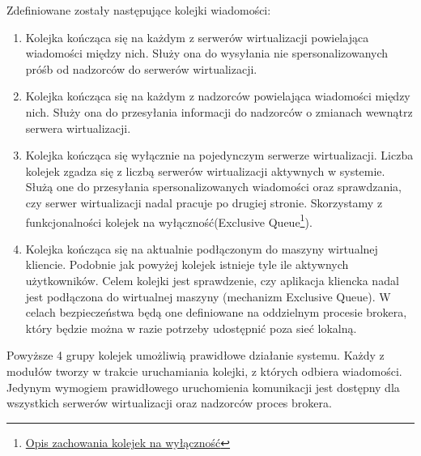 \documentclass[../opis-rozwiazania.tex]{subfiles}
\begin{document}
Zdefiniowane zostały następujące kolejki wiadomości:
\begin{enumerate}[label=(\Roman*)]
    \item \label{modules:broker:queue-virtsrv} Kolejka kończąca się na każdym z serwerów wirtualizacji powielająca wiadomości między nich.
          Służy ona do wysyłania nie spersonalizowanych próśb od nadzorców do serwerów wirtualizacji.
    \item \label{modules:broker:queue-overseers} Kolejka kończąca się na każdym z nadzorców powielająca wiadomości między nich.
          Służy ona do przesyłania informacji do nadzorców o zmianach wewnątrz serwera wirtualizacji.
    \item \label{modules:broker:queue-exclusive} Kolejka kończąca się wyłącznie na pojedynczym serwerze wirtualizacji.
          Liczba kolejek zgadza się z liczbą serwerów wirtualizacji aktywnych w systemie.
          Służą one do przesyłania spersonalizowanych wiadomości oraz sprawdzania, czy serwer wirtualizacji nadal pracuje po drugiej stronie.
          Skorzystamy z funkcjonalności kolejek na wyłączność(Exclusive Queue\footnote{\href{https://www.rabbitmq.com/queues.html\#exclusive-queues}{Opis zachowania kolejek na wyłączność}}).
    \item \label{modules:broker:queue-users} Kolejka kończąca się na aktualnie podłączonym do maszyny wirtualnej kliencie.
          Podobnie jak powyżej kolejek istnieje tyle ile aktywnych użytkowników.
          Celem kolejki jest sprawdzenie, czy aplikacja kliencka nadal jest podłączona do wirtualnej maszyny (mechanizm Exclusive Queue).
          W celach bezpieczeństwa będą one definiowane na oddzielnym procesie brokera, który będzie można w razie potrzeby udostępnić poza sieć lokalną.
\end{enumerate}

Powyższe 4 grupy kolejek umożliwią prawidłowe działanie systemu.
Każdy z modułów tworzy w trakcie uruchamiania kolejki, z których odbiera wiadomości.
Jedynym wymogiem prawidłowego uruchomienia komunikacji jest dostępny dla wszystkich serwerów wirtualizacji oraz nadzorców proces brokera.

\end{document}
